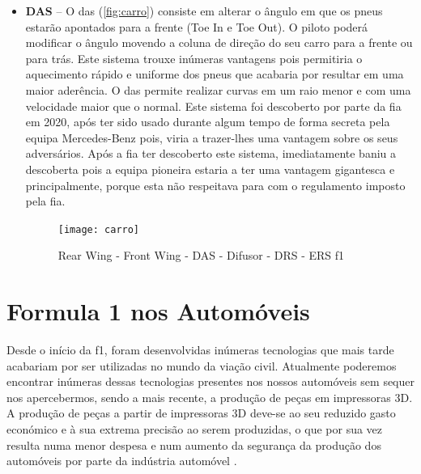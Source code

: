 \documentclass{report}
\begin{document}
\begin{itemize}
\item \textbf{DAS} – O \ac{das} \cite{das} (\autoref{fig:carro}) consiste em alterar o ângulo em que os pneus estarão apontados para a frente (Toe In e Toe Out). O piloto poderá modificar o ângulo movendo a coluna de direção do seu carro para a frente ou para trás. Este sistema trouxe inúmeras vantagens pois permitiria o aquecimento rápido e uniforme dos pneus que acabaria por resultar em uma maior aderência. O \ac{das} \cite{das} permite realizar curvas em um raio menor e com uma velocidade maior que o normal.
Este sistema foi descoberto por parte da \ac{fia} em 2020, após ter sido usado durante algum tempo de forma secreta pela equipa Mercedes-Benz pois, viria a trazer-lhes uma vantagem sobre os seus adversários. Após a \ac{fia} ter descoberto este sistema, imediatamente baniu a descoberta pois a equipa pioneira estaria a ter uma vantagem gigantesca e principalmente, porque esta não respeitava para com o regulamento imposto pela \ac{fia}. \\[1cm]

\begin{figure}[h]
\center %
\texttt{[image: carro]}
\caption{Rear Wing - Front Wing - DAS - Difusor - DRS - ERS \ac{f1}}
\label{fig:carro}
\end{figure}

\end{itemize}

\chapter{Formula 1 nos Automóveis}
Desde o início da \ac{f1}, foram desenvolvidas inúmeras tecnologias que mais tarde acabariam por ser utilizadas no mundo da viação civil. Atualmente poderemos encontrar inúmeras dessas tecnologias presentes nos nossos automóveis sem sequer nos apercebermos, sendo a mais recente, a produção de peças em impressoras 3D. A produção de peças a partir de impressoras 3D deve-se ao seu reduzido gasto económico e à sua extrema precisão ao serem produzidas, o que por sua vez resulta numa menor despesa e num aumento da segurança da produção dos automóveis por parte da indústria automóvel \cite{f1automoveis}.
\end{document}
